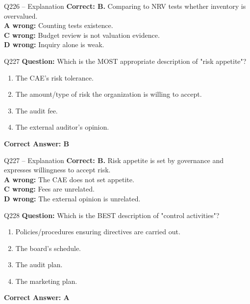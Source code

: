 \documentclass[aspectratio=169,10pt]{beamer}
\begin{document}
	\begin{frame}[t]{Q226 -- Explanation}
		\small
		\textbf{Correct: B.} Comparing to NRV tests whether inventory is overvalued. \\[4pt]
		\textbf{A wrong:} Counting tests existence. \\[2pt]
		\textbf{C wrong:} Budget review is not valuation evidence. \\[2pt]
		\textbf{D wrong:} Inquiry alone is weak.
	\end{frame}
	
	\begin{frame}[t]{Q227}
		\small
		\textbf{Question:} Which is the MOST appropriate description of "risk appetite"?
		\begin{enumerate}[label=\Alph*.,itemsep=1pt,topsep=2pt]
			\item The CAE's risk tolerance.
			\item The amount/type of risk the organization is willing to accept.
			\item The audit fee.
			\item The external auditor's opinion.
		\end{enumerate}
		\vspace{4pt}
		\textbf{Correct Answer: B}
	\end{frame}
	
	\begin{frame}[t]{Q227 -- Explanation}
		\small
		\textbf{Correct: B.} Risk appetite is set by governance and expresses willingness to accept risk. \\[4pt]
		\textbf{A wrong:} The CAE does not set appetite. \\[2pt]
		\textbf{C wrong:} Fees are unrelated. \\[2pt]
		\textbf{D wrong:} The external opinion is unrelated.
	\end{frame}
	
	\begin{frame}[t]{Q228}
		\small
		\textbf{Question:} Which is the BEST description of "control activities"?
		\begin{enumerate}[label=\Alph*.,itemsep=1pt,topsep=2pt]
			\item Policies/procedures ensuring directives are carried out.
			\item The board's schedule.
			\item The audit plan.
			\item The marketing plan.
		\end{enumerate}
		\vspace{4pt}
		\textbf{Correct Answer: A}
	\end{frame}
	
\end{document}
